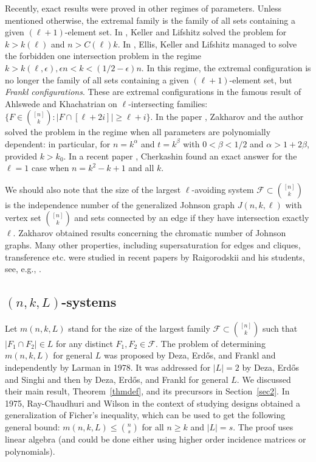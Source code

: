 \documentclass[graybox]{svmult}
\renewcommand{\le}{\leqslant}
\renewcommand{\ge}{\geqslant}
\newcommand{\ff}{\mathcal{F}}
\begin{document}
Recently, exact results were proved in other regimes of parameters. Unless mentioned otherwise, the extremal family is the family of all sets containing a given $(\ell+1)$-element set. In \cite{KL}, Keller and Lifshitz solved the problem for $k>k(\ell)$ and $n>C(\ell)k$. In \cite{EKL}, Ellis, Keller and Lifshitz managed to solve the forbidden one intersection problem  in the regime  $k>k(\ell,\epsilon), \epsilon n<k<(1/2-\epsilon)n$. In this regime, the extremal configuration is no longer the family of all sets containing a given $(\ell+1)$-element set, but {\it Frankl configurations}. These are extremal configurations in the famous result of Ahlswede and Khachatrian \cite{AK} on $\ell$-intersecting families: $\{F\in {[n]\choose k}: |F\cap [\ell+2i]|\ge \ell+i\}$.
In the paper \cite{KuZa}, Zakharov and the author solved the problem in the regime when all parameters are polynomially dependent: in particular, for $n =k^\alpha$ and $t=k^\beta$ with $0<\beta<1/2$ and $\alpha>1+2\beta$, provided $k>k_0$.
In a recent paper \cite{Cher}, Cherkashin found an exact answer for the $\ell=1$ case when $n = k^2-k+1$ and all $k$.

We should also note that the size of the largest $\ell$-avoiding system $\ff\subset{[n]\choose k}$ is the independence number of the generalized Johnson graph $J(n,k,\ell)$ with vertex set ${[n]\choose k}$ and sets connected by an edge if they have intersection exactly $\ell$. Zakharov \cite{Zak} obtained results concerning the chromatic number of Johnson graphs. Many other properties, including supersaturation for edges and cliques, transference etc. were studied in recent papers by Raigorodskii and his students, see, e.g., \cite{DNRS}.





\subsection{$(n,k,L)$-systems}
 Let $m(n,k,L)$ stand for the size of the largest family $\ff\subset {[n]\choose k}$ such that $|F_1\cap F_2|\in L$ for any distinct $F_1,F_2\in \ff$.
The problem of determining $m(n, k, L)$ for general $L$ was proposed by Deza, Erd\H os, and Frankl \cite{DEF} and independently by Larman \cite{Lar} in 1978. It was addressed for $|L|=2$ by Deza, Erd\H os and Singhi \cite{DES} and then by Deza, Erd\H os, and Frankl \cite{DEF} for general $L$. We discussed their main result, Theorem~\ref{thmdef}, and its precursors in Section~\ref{sec2}. In 1975, Ray-Chaudhuri and Wilson \cite{RW} in the context of studying designs obtained a generalization of Ficher's inequality, which can be used to get the following general bound: $m(n,k,L)\le {n\choose s}$ for all $n\ge k$ and $|L|= s$. The proof uses linear algebra (and could be done either using  higher order incidence matrices or polynomials).
\end{document}
